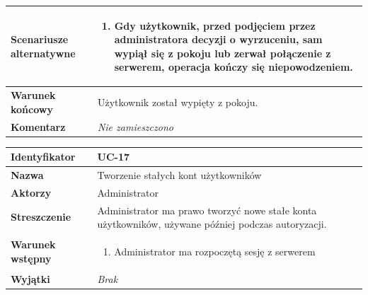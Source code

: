 \documentclass[11pt,oneside,a4paper,titlepage,onecolumn]{article}
\newenvironment{enumreq}
{ \begin{enumerate}[topsep=0pt,itemsep=-1ex,partopsep=1ex,parsep=1ex] }
{ \end{enumerate}                  }
\begin{document}
{\begin{tabular}{ | l | l | }
	\hline
		\parbox[t]{4cm}{\textbf{Scenariusze alternatywne}} & \parbox[t]
		{11cm}{
			\begin{enumreq}
				\item Gdy użytkownik, przed podjęciem przez administratora 
				decyzji o wyrzuceniu, sam wypiął się z pokoju lub zerwał
				połączenie z serwerem, operacja kończy się niepowodzeniem.
			\end{enumreq}
		}
		\\
		
	\hline
		\parbox[t]{4cm}{\textbf{Warunek końcowy}} & \parbox[t]{11cm}{
			Użytkownik został wypięty z pokoju.
		}
		\\
		
	\hline
		\parbox[t]{4cm}{\textbf{Komentarz}} & \parbox[t]{11cm}{
			\textit{Nie zamieszczono}
		}
		\\

	\hline
\end{tabular}


\vspace{2em}

\begin{tabular}{ | l | l | }
	\hline
		\textbf{Identyfikator} & 
		UC-17
		\\
		
	\hline
		\textbf{Nazwa} & 
		Tworzenie stałych kont użytkowników
		\\
		
	\hline
		\textbf{Aktorzy} & \parbox[t]{11cm}{
			Administrator
		}\\
		 
	\hline
		\parbox[t]{4cm}{\textbf{Streszczenie}} & \parbox[t]{11cm}{
			Administrator ma prawo tworzyć nowe stałe konta użytkowników,
			używane później podczas autoryzacji.
			
		}\\
		
	\hline
		\parbox[t]{4cm}{\textbf{Warunek wstępny}} & \parbox[t]{11cm}{
			\begin{enumreq}
				\item Administrator ma rozpoczętą sesję z serwerem
			\end{enumreq}
				
		}
		\\
		
	\hline
		\parbox[t]{4cm}{\textbf{Wyjątki}} & \parbox[t]{11cm}{
			\textit{Brak}
			
		}
		\\


\end{tabular}}
\end{document}
